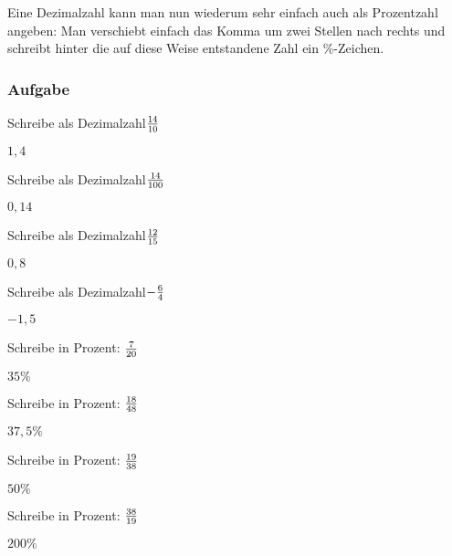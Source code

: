 \documentclass[
  ngerman,
]{book}
\begin{document}
Eine Dezimalzahl kann man nun wiederum sehr einfach auch als Prozentzahl angeben: Man verschiebt einfach das Komma um zwei Stellen nach rechts und schreibt hinter die auf diese Weise entstandene Zahl ein \%-Zeichen.

\hypertarget{section-3}{%
\subsubsection*{}\label{section-3}}

\hypertarget{aufgabe-1}{%
\subsubsection*{Aufgabe}\label{aufgabe-1}}

Schreibe als Dezimalzahl\(14 \over 10\)

\leavevmode\hypertarget{toggleText9}{}%
\(1,4\)

Schreibe als Dezimalzahl\(14 \over 100\)

\leavevmode\hypertarget{toggleText10}{}%
\(0,14\)

Schreibe als Dezimalzahl\(12 \over 15\)

\leavevmode\hypertarget{toggleText11}{}%
\(0,8\)

Schreibe als Dezimalzahl\(-{6 \over 4}\)

\leavevmode\hypertarget{toggleText12}{}%
\(-1,5\)

Schreibe in Prozent: \(7 \over 20\)

\leavevmode\hypertarget{toggleText13}{}%
\(35\%\)

Schreibe in Prozent: \(18 \over 48\)

\leavevmode\hypertarget{toggleText14}{}%
\(37,5\%\)

Schreibe in Prozent: \(19 \over 38\)

\leavevmode\hypertarget{toggleText15}{}%
\(50\%\)

Schreibe in Prozent: \(38 \over 19\)

\leavevmode\hypertarget{toggleText16}{}%
\(200\%\)

\hypertarget{section-4}{%
\subsubsection*{}\label{section-4}}

\hypertarget{section-5}{%
\subsubsection*{}\label{section-5}}
\end{document}
